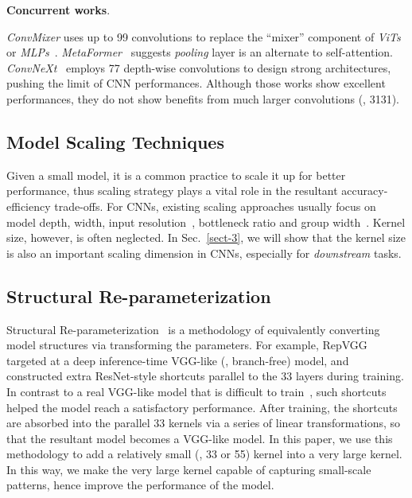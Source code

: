 \documentclass[10pt,twocolumn,letterpaper]{article}
\begin{document}
	
	\noindent \textbf{Concurrent works}.  
	
	\emph{ConvMixer} \cite{trockman2022patches} uses up to 99 convolutions to replace the ``mixer'' component of \emph{ViTs}~\cite{vit} or \emph{MLPs}~\cite{tolstikhin2021mlp,touvron2021resmlp}. \emph{MetaFormer}~\cite{yu2021metaformer} suggests \emph{pooling} layer is an alternate to self-attention. \emph{ConvNeXt}~\cite{liu2022convnet} employs 77 depth-wise convolutions to design strong architectures, pushing the limit of CNN performances. Although those works show excellent performances, they do not show benefits from much larger convolutions (\eg, 3131). 
	
	
	\subsection{Model Scaling Techniques}
	
	Given a small model, it is a common practice to scale it up for better performance, thus scaling strategy plays a vital role in the resultant accuracy-efficiency trade-offs. For CNNs, existing scaling approaches usually focus on model depth, width, input resolution~\cite{efficientnet,regnet,dollar2021fast}, bottleneck ratio and group width~\cite{regnet,dollar2021fast}. Kernel size, however, is often neglected. In Sec.~\ref{sect-3}, we will show that the kernel size is also an important scaling dimension in CNNs, especially for \emph{downstream} tasks. 
	

	
	\subsection{Structural Re-parameterization}
	
	Structural Re-parameterization~\cite{ding2021repvgg,ding2021diverse,ding2021resrep,ding2021repmlpnet,ding2019acnet} is a methodology of equivalently converting model structures via transforming the parameters. For example, RepVGG targeted at a deep inference-time VGG-like (\eg, branch-free) model, and constructed extra ResNet-style shortcuts parallel to the 33 layers during training. In contrast to a real VGG-like model that is difficult to train~\cite{he2016deep}, such shortcuts helped the model reach a satisfactory performance. After training, the shortcuts are absorbed into the parallel 33 kernels via a series of linear transformations, so that the resultant model becomes a VGG-like model. In this paper, we use this methodology to add a relatively small (\eg, 33 or 55) kernel into a very large kernel. In this way, we make the very large kernel capable of capturing small-scale patterns, hence improve the performance of the model.
	
\end{document}
